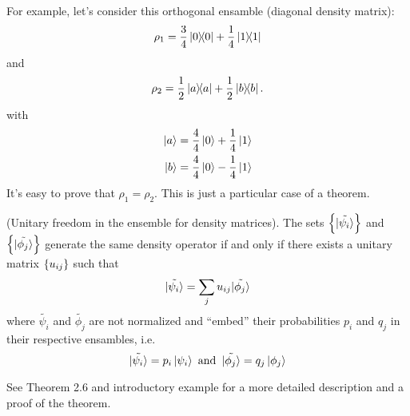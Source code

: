 For example, let's consider this orthogonal ensamble (diagonal density matrix):
\[
  \rho_1 = \frac{3}{4}\ketbra{0}{0} + \frac{1}{4}\ketbra{1}{1}
\]
and
\[
  \rho_2 = \frac{1}{2}\ketbra{a}{a} + \frac{1}{2}\ketbra{b}{b}\text{.}
\]
with
\begin{align*}
  \ket{a} &= \frac{4}{4}\ket{0} + \frac{1}{4}\ket{1} \\
  \ket{b} &= \frac{4}{4}\ket{0} - \frac{1}{4}\ket{1}
\end{align*}
It's easy to prove that $\rho_1 = \rho_2$. This is just a particular
case of a theorem.
\begin{theorem}{(Unitary freedom in the ensemble for density matrices).}
  The sets $\left\{\tilde{\ket{\psi_i}}\right\}$ and $\left\{\tilde{\ket{\phi_j}}\right\}$
  generate the same density operator if and only if there exists
  a unitary matrix $\left\{u_{ij}\right\}$ such that
  \[
    \tilde{\ket{\psi_i}} = \sum_j u_{ij}\tilde{\ket{\phi_j}}
  \]
  where $\tilde{\psi_i}$ and $\tilde{\phi_j}$ are not normalized and
  ``embed'' their probabilities $p_i$ and $q_j$ in their respective ensambles,
  i.e.
  \[
    \tilde{\ket{\psi_i}} = p_{i}\ket{\psi_i}
    \text{ and }\,
    \tilde{\ket{\phi_j}} = q_{j}\ket{\phi_j}
  \]
\end{theorem}
See \cite{NielsenChuang}{Theorem 2.6 and introductory example}
for a more detailed description and a proof of the theorem.
